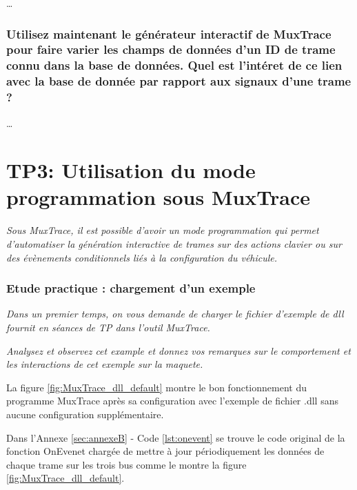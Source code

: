\documentclass{rapportECC}
\begin{document}
\dots

\subsubsection*{Utilisez maintenant le générateur interactif de MuxTrace pour faire varier les champs de données d'un ID de trame connu dans la base de données. Quel est l'intéret de ce lien avec la base de donnée par rapport aux signaux d'une trame ?}

\dots



\section{TP3: Utilisation du mode programmation sous MuxTrace}

\textit{Sous MuxTrace, il est possible d'avoir un mode programmation qui permet d'automatiser la génération interactive de trames sur des actions clavier ou sur des évènements conditionnels liés à la configuration du véhicule.}


\subsubsection*{Etude practique : chargement d'un exemple}

\textit{Dans un premier temps, on vous demande de charger le fichier d'exemple de dll fournit en séances de TP dans l'outil MuxTrace.}

\textit{Analysez et observez cet example et donnez vos remarques sur le comportement et les interactions de cet exemple sur la maquete.}

La figure \ref{fig:MuxTrace_dll_default} montre le bon fonctionnement du programme MuxTrace après sa configuration avec l'exemple de fichier .dll sans aucune configuration supplémentaire.

Dans l'Annexe \ref{sec:annexeB} - Code \ref{lst:onevent} se trouve le code original de la fonction OnEvenet chargée de mettre à jour périodiquement les données de chaque trame sur les trois bus comme le montre la figure \ref{fig:MuxTrace_dll_default}.
\end{document}
